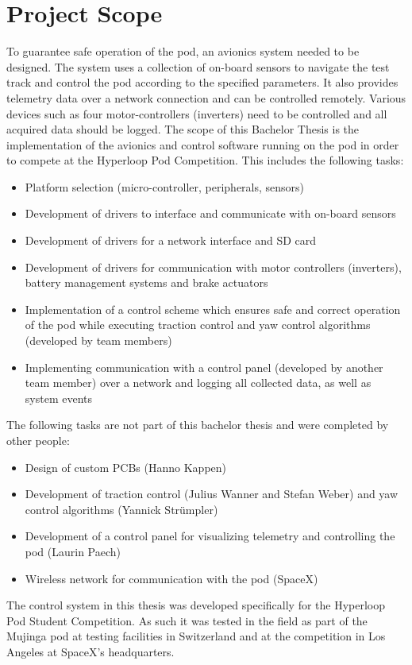 \section{Project Scope}

To guarantee safe operation of the pod, an avionics system needed to be designed. The system uses a collection of on-board sensors to navigate the test track and control the pod according to the specified parameters. It also provides telemetry data over a network connection and can be controlled remotely. Various devices such as four motor-controllers (inverters) need to be controlled and all acquired data should be logged. The scope of this Bachelor Thesis is the implementation of the avionics and control software running on the pod in order to compete at the Hyperloop Pod Competition. This includes the following tasks:

\begin{itemize}
    \item Platform selection (micro-controller, peripherals, sensors)
    \item Development of drivers to interface and communicate with on-board sensors
    \item Development of drivers for a network interface and SD card
    \item Development of drivers for communication with motor controllers (inverters), battery management systems and brake actuators
    \item Implementation of a control scheme which ensures safe and correct operation of the pod while executing traction control and yaw control algorithms (developed by team members)
    \item Implementing communication with a control panel (developed by another team member) over a network and logging all collected data, as well as system events
\end{itemize}

The following tasks are not part of this bachelor thesis and were completed by other people:

\begin{itemize}
    \item Design of custom PCBs (Hanno Kappen)
    \item Development of traction control (Julius Wanner and Stefan Weber) and yaw control algorithms (Yannick Strümpler)
    \item Development of a control panel for visualizing telemetry and controlling the pod (Laurin Paech)
    \item Wireless network for communication with the pod (SpaceX)
\end{itemize}

The control system in this thesis was developed specifically for the Hyperloop Pod Student Competition. As such it was tested in the field as part of the Mujinga pod at testing facilities in Switzerland and at the competition in Los Angeles at SpaceX's headquarters.

